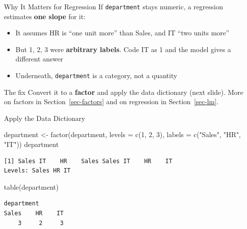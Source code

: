 \documentclass[
  ignorenonframetext,
  aspectratio=169,
]{beamer}
\newenvironment{Shaded}{\begin{snugshade}}{\end{snugshade}}
\newcommand{\AttributeTok}[1]{\textcolor[rgb]{0.40,0.45,0.13}{#1}}
\newcommand{\DecValTok}[1]{\textcolor[rgb]{0.68,0.00,0.00}{#1}}
\newcommand{\FunctionTok}[1]{\textcolor[rgb]{0.28,0.35,0.67}{#1}}
\newcommand{\NormalTok}[1]{\textcolor[rgb]{0.00,0.23,0.31}{#1}}
\newcommand{\OtherTok}[1]{\textcolor[rgb]{0.00,0.23,0.31}{#1}}
\newcommand{\StringTok}[1]{\textcolor[rgb]{0.13,0.47,0.30}{#1}}
\providecommand{\tightlist}{%
  \setlength{\itemsep}{0pt}\setlength{\parskip}{0pt}}\usepackage{longtable,booktabs,array}
\begin{document}
\begin{frame}[fragile]{Why It Matters for Regression}
\protect\hypertarget{why-it-matters-for-regression}{}
If \texttt{department} stays numeric, a regression estimates \textbf{one
slope} for it:

\begin{itemize}
\tightlist
\item
  It assumes HR is ``one unit more'' than Sales, and IT ``two units
  more''
\item
  But 1, 2, 3 were \textbf{arbitrary labels}. Code IT as 1 and the model
  gives a different answer
\item
  Underneath, \texttt{department} is a category, not a quantity
\end{itemize}

\begin{block}{The fix}
\protect\hypertarget{the-fix}{}
Convert it to a \textbf{factor} and apply the data dictionary (next
slide). More on factors in Section~\ref{sec-factors} and on regression
in Section~\ref{sec-lm}.
\end{block}
\end{frame}

\begin{frame}[fragile]{Apply the Data Dictionary}
\protect\hypertarget{apply-the-data-dictionary}{}
\begin{Shaded}
\begin{Highlighting}[]
\NormalTok{department }\OtherTok{\textless{}{-}} \FunctionTok{factor}\NormalTok{(department,}
                     \AttributeTok{levels =} \FunctionTok{c}\NormalTok{(}\DecValTok{1}\NormalTok{, }\DecValTok{2}\NormalTok{, }\DecValTok{3}\NormalTok{),}
                     \AttributeTok{labels =} \FunctionTok{c}\NormalTok{(}\StringTok{"Sales"}\NormalTok{, }\StringTok{"HR"}\NormalTok{, }\StringTok{"IT"}\NormalTok{))}
\NormalTok{department}
\end{Highlighting}
\end{Shaded}

\begingroup\tiny\color{darkgray}

\begin{verbatim}
[1] Sales IT    HR    Sales Sales IT    HR    IT   
Levels: Sales HR IT
\end{verbatim}

\endgroup

\begin{Shaded}
\begin{Highlighting}[]
\FunctionTok{table}\NormalTok{(department)}
\end{Highlighting}
\end{Shaded}

\begingroup\tiny\color{darkgray}

\begin{verbatim}
department
Sales    HR    IT 
    3     2     3 
\end{verbatim}

\endgroup
\end{frame}
\end{document}
